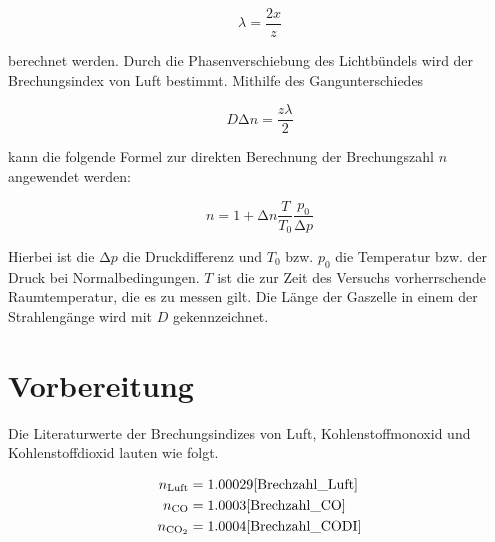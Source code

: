 \begin{equation}
\label{eqn:Laenge}
    \lambda = \frac{2x}{z}
\end{equation}

\noindent berechnet werden.
\newpage
\noindent Durch die Phasenverschiebung des Lichtbündels wird der Brechungsindex von Luft bestimmt. Mithilfe des Gangunterschiedes 

\begin{equation}
\label{eqn:delta_n}
    D\increment{}n = \frac{z\lambda}{2}
\end{equation}

\noindent kann die folgende Formel zur direkten Berechnung der Brechungszahl $n$ angewendet werden:

\begin{equation}
\label{eqn:Brechungsindex}
    n = 1 + \increment{}n\frac{T}{T_0}\frac{p_0}{\increment{}p}
\end{equation}

\noindent Hierbei ist die $\increment{}p$ die Druckdifferenz und $T_0$ bzw. $p_0$ die Temperatur bzw. der Druck bei Normalbedingungen.
$T$ ist die zur Zeit des Versuchs vorherrschende Raumtemperatur, die es zu messen gilt. Die Länge der Gaszelle in einem der Strahlengänge 
wird mit $D$ gekennzeichnet.
 
\section{Vorbereitung}

Die Literaturwerte der Brechungsindizes von Luft, Kohlenstoffmonoxid und Kohlenstoffdioxid lauten wie folgt.

\begin{align}
    n_\text{Luft} &= 1.00029\text{\cite{Brechzahl_Luft}}\\ 
    n_\text{CO} &= 1.0003\text{\cite{Brechzahl_CO}}\\ 
    n_\text{CO$_2$} &= 1.0004\text{\cite{Brechzahl_CODI}}\\
\end{align}

%


